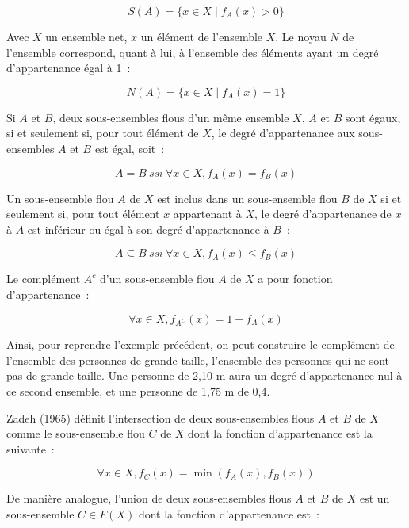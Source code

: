 \begin{equation}
  S(A) = \{x ∈ X \mid f_A(x) > 0\}
\end{equation}

Avec $X$ un ensemble net, $x$ un élément de l’ensemble $X$. Le noyau
$N$ de l’ensemble correspond, quant à lui, à l’ensemble des éléments
ayant un degré d’appartenance égal à 1 :

\begin{equation}
  N(A) = \{x ∈ X \mid f_A(x) = 1\}
\end{equation}

Si $A$ et $B$, deux sous-ensembles flous d’un même ensemble $X$, $A$
et $B$ sont égaux, si et seulement si, pour tout élément de $X$, le
degré d’appartenance aux sous-ensembles $A$ et $B$ est égal, soit :

\begin{equation}
  A = B\ ssi\ ∀x ∈ X, f_A(x) = f_B(x)
\end{equation}

Un sous-ensemble flou $A$ de $X$ est inclus dans un sous-ensemble flou
$B$ de $X$ si et seulement si, pour tout élément $x$ appartenant à
$X$, le degré d’appartenance de $x$ à $A$ est inférieur ou égal à son
degré d’appartenance à $B$ :

\begin{equation}
  A ⊆ B\ ssi\ ∀x ∈ X, f_A(x) ≤ f_B(x)
\end{equation}

Le complément $A^c$ d’un sous-ensemble flou $A$ de $X$ a pour fonction
d’appartenance :

\begin{equation}
  ∀x ∈ X, f_{A^C}(x) = 1 − f_A(x)
\end{equation}

Ainsi, pour reprendre l’exemple précédent, on peut construire le
complément de l’ensemble des personnes de grande taille, l’ensemble
des personnes qui ne sont pas de grande taille. Une personne de 2,10 m
aura un degré d’appartenance nul à ce second ensemble, et une personne
de 1,75 m de 0,4.

Zadeh (1965) définit l’intersection de deux sous-ensembles flous $A$
et $B$ de $X$ comme le sous-ensemble flou $C$ de $X$ dont la fonction
d’appartenance est la suivante :

\begin{equation}
  \label{eq:norm_zadeh}
  ∀x ∈ X, f_C (x) = \min(f_A(x), f_B(x))
\end{equation}

De manière analogue, l’union de deux sous-ensembles flous $A$ et $B$
de $X$ est un sous-ensemble $C ∈ F(X)$ dont la fonction d’appartenance
est :

